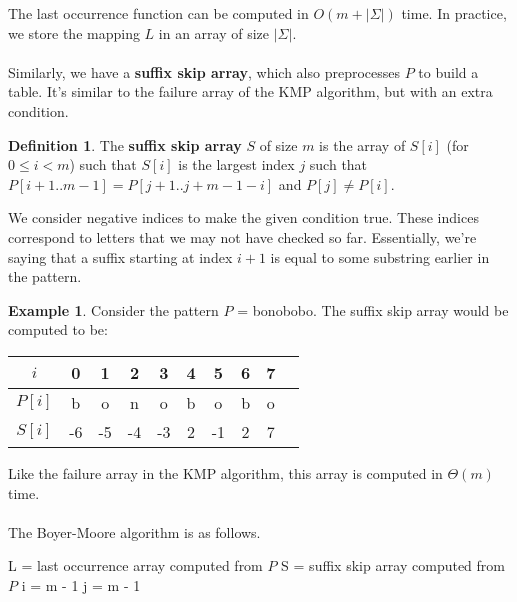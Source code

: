 \documentclass[]{article}
\theoremstyle{definition}
\newtheorem*{defn}{Definition}
\newtheorem{ex}{Example}[section]
\begin{document}
				The last occurrence function can be computed in $O(m + |\Sigma|)$ time. In practice, we store the mapping $L$ in an array of size $|\Sigma|$.
				\\ \\
				Similarly, we have a \textbf{suffix skip array}, which also preprocesses $P$ to build a table. It's similar to the failure array of the KMP algorithm, but with an extra condition.
				\begin{defn}
					The \textbf{suffix skip array} $S$ of size $m$ is the array of $S[i]$ (for $0 \le i < m$) such that $S[i]$ is the largest index $j$ such that $P[i + 1..m - 1] = P[j + 1..j+ m - 1 - i]$ and $P[j] \ne P[i]$.
				\end{defn}

				We consider negative indices to make the given condition true. These indices correspond to letters that we may not have checked so far. Essentially, we're saying that a suffix starting at index $i + 1$ is equal to some substring earlier in the pattern.

				\begin{ex}
					Consider the pattern $P$ = bonobobo. The suffix skip array would be computed to be:
					\begin{center}
						\begin{tabular}{|c||c|c|c|c|c|c|c|c|c|}
							\hline
							$i$ & 0 & 1 & 2 & 3 & 4 & 5 & 6 & 7 \\ \hline
							$P[i]$ & b & o & n & o & b & o & b & o \\
							$S[i]$ & -6 & -5 & -4 & -3 & 2 & -1 & 2 & 7 \\ \hline
						\end{tabular}
					\end{center}
				\end{ex}

				Like the failure array in the KMP algorithm, this array is computed in $\Theta(m)$ time.
				\\ \\
				The Boyer-Moore algorithm is as follows. \\
				\begin{algorithm}[H]
					L = last occurrence array computed from $P$\;
					S = suffix skip array computed from $P$\;
					i = m - 1\;
					j = m - 1\;
				\end{algorithm}
\end{document}
